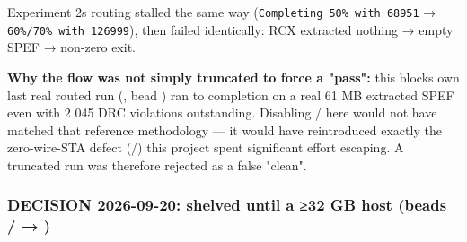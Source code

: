 \begin{record}
{}

Experiment 2\textquotesingle s routing stalled the same way
(\texttt{Completing\ 50\%\ with\ 68951} →
\texttt{60\%/\allowbreak{}70\%\ with\ 126999}), then 
failed identically: RCX extracted nothing → empty SPEF →
 non-zero exit.

\textbf{Why the flow was not simply truncated to force a "pass":} this
block\textquotesingle s own last real routed run
(, bead ) ran 
to completion on a real 61 MB extracted SPEF even with 2 045 DRC
violations outstanding. Disabling  /
 here would not have matched that reference methodology
--- it would have reintroduced exactly the zero-wire-STA defect
(/) this project spent significant effort escaping.
A truncated run was therefore rejected as a false "clean".

\end{record}

\subsubsection{\texorpdfstring{\hold{} DECISION 2026-09-20: shelved
until a ≥32 GB host (beads / →
)}{ DECISION 2026-09-20: shelved until a ≥32 GB host (beads / → )}}\label{cr:run:asap7:pause-button-decision-2026-09-20-shelved-until-a-32-gb-host-beads-lxvma7-2kn}

